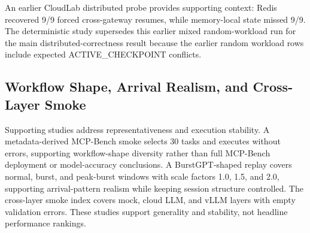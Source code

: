 \documentclass[5p,times]{elsarticle}
\begin{document}
An earlier CloudLab distributed probe provides supporting context: Redis recovered 9/9 forced cross-gateway resumes, while memory-local state missed 9/9. The deterministic study supersedes this earlier mixed random-workload run for the main distributed-correctness result because the earlier random workload rows include expected ACTIVE\_CHECKPOINT conflicts.

\subsection{Workflow Shape, Arrival Realism, and Cross-Layer Smoke}

Supporting studies address representativeness and execution stability. A metadata-derived MCP-Bench smoke selects 30 tasks and executes without errors, supporting workflow-shape diversity rather than full MCP-Bench deployment or model-accuracy conclusions. A BurstGPT-shaped replay covers normal, burst, and peak-burst windows with scale factors 1.0, 1.5, and 2.0, supporting arrival-pattern realism while keeping session structure controlled. The cross-layer smoke index covers mock, cloud LLM, and vLLM layers with empty validation errors. These studies support generality and stability, not headline performance rankings.
\end{document}
